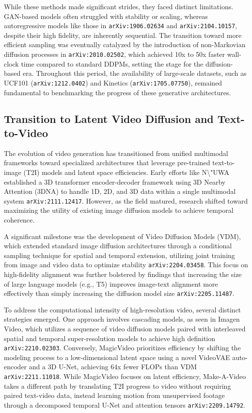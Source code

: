 \documentclass[11pt]{article}
\begin{document}
While these methods made significant strides, they faced distinct limitations. GAN-based models often struggled with stability or scaling, whereas autoregressive models like those in \texttt{arXiv:1906.02634} and \texttt{arXiv:2104.10157}, despite their high fidelity, are inherently sequential. The transition toward more efficient sampling was eventually catalyzed by the introduction of non-Markovian diffusion processes in \texttt{arXiv:2010.02502}, which achieved 10x to 50x faster wall-clock time compared to standard DDPMs, setting the stage for the diffusion-based era. Throughout this period, the availability of large-scale datasets, such as UCF101 (\texttt{arXiv:1212.0402}) and Kinetics (\texttt{arXiv:1705.07750}), remained fundamental to benchmarking the progress of these generative architectures.

\subsection{Transition to Latent Video Diffusion and Text-to-Video}

The evolution of video generation has transitioned from unified multimodal frameworks toward specialized architectures that leverage pre-trained text-to-image (T2I) models and latent space efficiencies. Early efforts like N\textbackslash{}"UWA established a 3D transformer encoder-decoder framework using 3D Nearby Attention (3DNA) to handle 1D, 2D, and 3D data within a single multimodal system \texttt{arXiv:2111.12417}. However, as the field matured, research shifted toward maximizing the utility of existing image diffusion models to achieve temporal coherence.

A significant milestone was the development of Video Diffusion Models (VDM), which extended standard image diffusion architectures through a conditional sampling technique for spatial and temporal extension, utilizing joint training from image and video data to optimize stability \texttt{arXiv:2204.03458}. This focus on high-fidelity alignment was further bolstered by findings that increasing the size of large language models (e.g., T5) improves image-text alignment more effectively than simply increasing the diffusion model size \texttt{arXiv:2205.11487}.

To address the computational intensity of high-resolution video, several distinct strategies emerged. One approach involves cascading models, as seen in Imagen Video, which utilizes a sequence of video diffusion models paired with interleaved spatial and temporal super-resolution models to achieve high definition \texttt{arXiv:2210.02303}. Conversely, MagicVideo prioritizes efficiency by shifting the modeling process to a low-dimensional latent space using a novel VideoVAE auto-encoder and a 3D U-Net, achieving 64x fewer FLOPs than VDM \texttt{arXiv:2211.11018}. While MagicVideo focuses on latent efficiency, Make-A-Video takes a different path by translating T2I progress to video without requiring paired text-video data, instead learning motion from unsupervised footage through a decomposed temporal U-Net and attention tensors \texttt{arXiv:2209.14792}.
\end{document}
